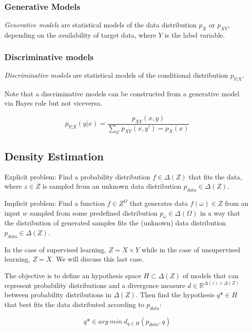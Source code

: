 \documentclass[11pt]{article}
\begin{document}
\subsubsection{Generative Models}\label{generative-models}

\emph{Generative models} are statistical models of the data distribution
\(p_X\) or \(p_{XY}\), depending on the availability of target data,
where \(Y\) is the label variable.

\subsubsection{Discriminative models}\label{discriminative-models}

\emph{Discriminative models} are statistical models of the conditional
distribution \(p_{Y|X}\).

Note that a discriminative models can be constructed from a generative
model via Bayes rule but not viceversa.

\[p_{Y|X}(y|x)=\frac{p_{XY}(x, y)}{\sum_{y'}p_{XY}(x, y') = p_X(x)}\]

\subsection{Density Estimation}\label{density-estimation}

Explicit problem: Find a probability distribution \(f\in \Delta (Z)\)
that fits the data, where \(z\in Z\) is sampled from an unknown data
distribution \(p_{data}\in \Delta (Z)\).

Implicit problem: Find a function \(f\in Z^{\Omega}\) that generates
data \(f(\omega)\in Z\) from an input \(w\) sampled from some predefined
distribution \(p_\omega \in \Delta (\Omega)\) in a way that the
distribution of generated samples fits the (unknown) data distribution
\(p_{data}\in \Delta (Z)\).

In the case of supervised learning, \(Z=X\times Y\) while in the case of
unsupervised learning, \(Z=X\). We will discuss this last case.

The objective is to define an hypothesis space \(H\subset \Delta (Z)\)
of models that can represent probability distributions and a divergence
measure \(d\in \mathbb{R}^{\Delta (z)\times \Delta (Z)}\) between
probability distributions in \(\Delta (Z)\). Then find the hypothesis
\(q*\in H\) that best fits the data distributed according to
\(p_{data}\):

\[q*\in arg\ min\ d_{q\in H}(p_{data}, q)\]
\end{document}
